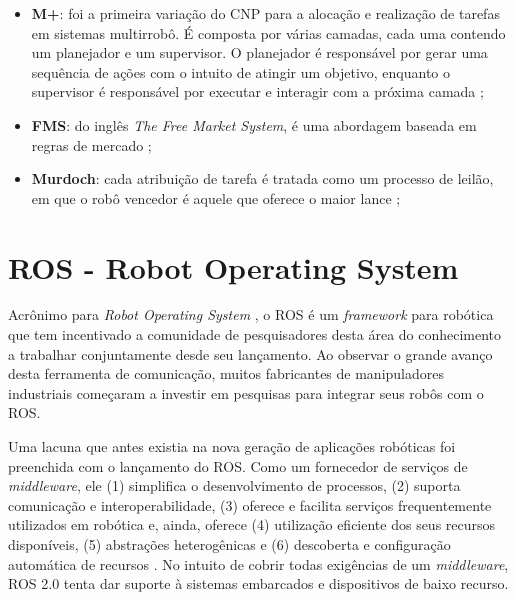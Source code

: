                 \begin{itemize}
                    \item \textbf{M+}: foi a primeira variação do CNP para a alocação e realização de tarefas em sistemas multirrobô. É composta por várias camadas, cada uma contendo um planejador e um supervisor. O planejador é responsável por gerar uma sequência de ações com o intuito de atingir um objetivo, enquanto o supervisor é responsável por executar e interagir com a próxima camada \cite{ref:botelho1999m+};
                    
                    \item \textbf{FMS}: do inglês \textit{The Free Market System}, é uma abordagem baseada em regras de mercado \cite{ref:dias2000fms};
                    
                    \item \textbf{Murdoch}: cada atribuição de tarefa é tratada como um processo de leilão, em que o robô vencedor é aquele que oferece o maior lance \cite{ref:gerkey2002murdoch};
                \end{itemize}
                
    \section{ROS - Robot Operating System} \label{sec:ros}
        Acrônimo para \textit{Robot Operating System} \cite{ref:quigley2009ros}, o ROS é um \textit{framework} para robótica que tem incentivado a comunidade de pesquisadores desta área do conhecimento a trabalhar conjuntamente desde seu lançamento. Ao observar o grande avanço desta ferramenta de comunicação, muitos fabricantes de manipuladores industriais começaram a investir em pesquisas para integrar seus robôs com o ROS. 
        
        Uma lacuna que antes existia na nova geração de aplicações robóticas foi preenchida com o lançamento do ROS. Como um fornecedor de serviços de \textit{middleware}, ele (1) simplifica o desenvolvimento de processos, (2) suporta comunicação e interoperabilidade, (3) oferece e facilita serviços frequentemente utilizados em robótica e, ainda, oferece (4) utilização eficiente dos seus recursos disponíveis, (5) abstrações heterogênicas e (6) descoberta e configuração automática de recursos \cite{ref:quigley2009ros}. No intuito de cobrir todas exigências de um \textit{middleware}, ROS 2.0 tenta dar suporte à sistemas embarcados e dispositivos de baixo recurso.
    
